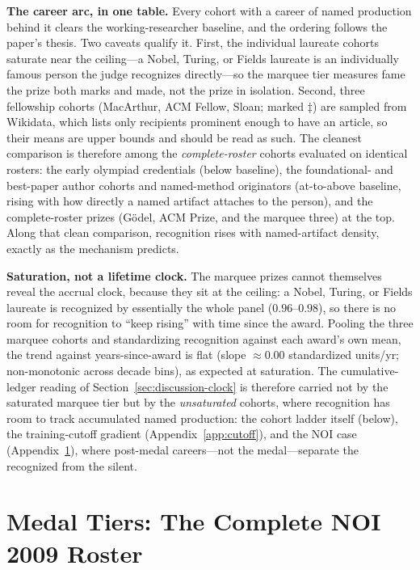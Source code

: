 \textbf{The career arc, in one table.} Every cohort with a career of named production behind it clears the working-researcher baseline, and the ordering follows the paper's thesis. Two caveats qualify it. First, the individual laureate cohorts saturate near the ceiling---a Nobel, Turing, or Fields laureate is an individually famous person the judge recognizes directly---so the marquee tier measures fame the prize both marks and made, not the prize in isolation. Second, three fellowship cohorts (MacArthur, ACM Fellow, Sloan; marked $\ddagger$) are sampled from Wikidata, which lists only recipients prominent enough to have an article, so their means are upper bounds and should be read as such. The cleanest comparison is therefore among the \emph{complete-roster} cohorts evaluated on identical rosters: the early olympiad credentials (below baseline), the foundational- and best-paper author cohorts and named-method originators (at-to-above baseline, rising with how directly a named artifact attaches to the person), and the complete-roster prizes (Gödel, ACM Prize, and the marquee three) at the top. Along that clean comparison, recognition rises with named-artifact density, exactly as the mechanism predicts.

\textbf{Saturation, not a lifetime clock.} The marquee prizes cannot themselves reveal the accrual clock, because they sit at the ceiling: a Nobel, Turing, or Fields laureate is recognized by essentially the whole panel ($0.96$--$0.98$), so there is no room for recognition to ``keep rising'' with time since the award. Pooling the three marquee cohorts and standardizing recognition against each award's own mean, the trend against years-since-award is flat (slope ${\approx}0.00$ standardized units/yr; non-monotonic across decade bins), as expected at saturation. The cumulative-ledger reading of Section~\ref{sec:discussion-clock} is therefore carried not by the saturated marquee tier but by the \emph{unsaturated} cohorts, where recognition has room to track accumulated named production: the cohort ladder itself (below), the training-cutoff gradient (Appendix~\ref{app:cutoff}), and the NOI case (Appendix~\ref{app:medal-tiers}), where post-medal careers---not the medal---separate the recognized from the silent.


\section{Medal Tiers: The Complete NOI 2009 Roster}
\label{app:medal-tiers}

